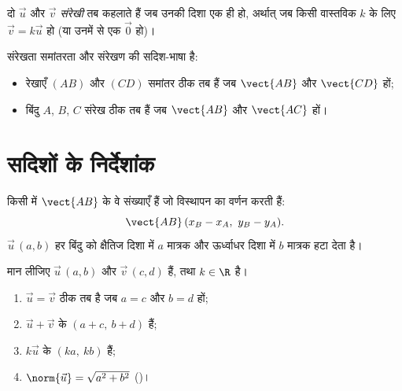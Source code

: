 \begin{definition}[संरेखता]\label{def:g10:vectors:collinear}
दो  $\vec u$ और $\vec v$ \emph{संरेखी} तब कहलाते हैं जब उनकी
दिशा एक ही हो, अर्थात् जब किसी वास्तविक $k$ के लिए $\vec v = k \vec u$ हो (या उनमें से एक
$\vec 0$ हो)।
\end{definition}

\begin{remark}
संरेखता समांतरता और संरेखण की सदिश-भाषा है:
\begin{itemize}
  \item रेखाएँ $(AB)$ और $(CD)$ समांतर ठीक तब हैं जब $\vect{AB}$ और $\vect{CD}$  हों;
  \item बिंदु $A$, $B$, $C$ संरेख ठीक तब हैं जब $\vect{AB}$ और $\vect{AC}$  हों।
\end{itemize}
\end{remark}

\section{सदिशों के निर्देशांक}

\begin{definition}[सदिश के निर्देशांक]\label{def:g10:vectors:coords}
किसी  में  $\vect{AB}$ के \emph{} वे संख्याएँ हैं
जो विस्थापन का वर्णन करती हैं:
\[
\vect{AB}\,(x_B - x_A,\ y_B - y_A).
\]
 $\vec u\,(a, b)$ हर बिंदु को क्षैतिज दिशा में $a$ मात्रक और ऊर्ध्वाधर दिशा में
$b$ मात्रक हटा देता है।
\end{definition}

\begin{proposition}[निर्देशांकों के साथ गणना]\label{prop:g10:vectors:coordrules}
मान लीजिए $\vec u\,(a, b)$ और $\vec v\,(c, d)$ हैं, तथा $k \in \R$ है।
\begin{enumerate}
  \item $\vec u = \vec v$ ठीक तब है जब $a = c$ और $b = d$ हों;
  \item $\vec u + \vec v$ के  $(a + c,\ b + d)$ हैं;
  \item $k\vec u$ के  $(ka,\ kb)$ हैं;
  \item $\norm{\vec u} = \sqrt{a^2 + b^2}$ ()।
\end{enumerate}
\end{proposition}

